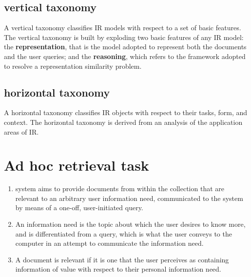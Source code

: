 \subsection{vertical taxonomy}

A vertical taxonomy classifies IR models with respect to a set of basic features.
The vertical taxonomy is built by exploding two basic features of any IR model: the \textbf{representation}, that is the model adopted to represent both the documents and the user queries; and the \textbf{reasoning}, which refers to the framework adopted to resolve a representation similarity problem. 

\subsection{horizontal taxonomy}

A horizontal taxonomy classifies IR objects with respect to their tasks, form, and context. 
The horizontal taxonomy is derived from an analysis of the application areas of IR.


\section{Ad hoc retrieval task}\label{ad hoc retrieval task}
\begin{enumerate}
    \item system aims to provide documents from within the collection that are relevant to an arbitrary user information need, communicated to the system by means of a one-off, user-initiated query. 
    
    \item An information need is the topic about which the user desires to know more, and is differentiated from a query, which is what the user conveys to the computer in an attempt to communicate the information need.

    \item A document is relevant if it is one that the user perceives as containing information of value with respect to their personal information need.
\end{enumerate}








































